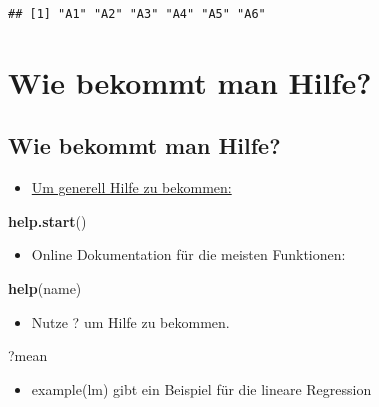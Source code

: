 \documentclass[]{article}
\newenvironment{Shaded}{\begin{snugshade}}{\end{snugshade}}
\newcommand{\KeywordTok}[1]{\textcolor[rgb]{0.13,0.29,0.53}{\textbf{{#1}}}}
\newcommand{\NormalTok}[1]{{#1}}
\providecommand{\tightlist}{%
  \setlength{\itemsep}{0pt}\setlength{\parskip}{0pt}}
\begin{document}
\begin{verbatim}
## [1] "A1" "A2" "A3" "A4" "A5" "A6"
\end{verbatim}

\section{Wie bekommt man Hilfe?}\label{wie-bekommt-man-hilfe}

\subsection{Wie bekommt man Hilfe?}\label{wie-bekommt-man-hilfe-1}

\begin{itemize}
\tightlist
\item
  \href{http://itfeature.com/tag/how-to-get-help-in-r}{Um generell Hilfe
  zu bekommen:}
\end{itemize}

\begin{Shaded}
\begin{Highlighting}[]
\KeywordTok{help.start}\NormalTok{()}
\end{Highlighting}
\end{Shaded}

\begin{itemize}
\tightlist
\item
  Online Dokumentation für die meisten Funktionen:
\end{itemize}

\begin{Shaded}
\begin{Highlighting}[]
\KeywordTok{help}\NormalTok{(name)}
\end{Highlighting}
\end{Shaded}

\begin{itemize}
\tightlist
\item
  Nutze ? um Hilfe zu bekommen.
\end{itemize}

\begin{Shaded}
\begin{Highlighting}[]
\NormalTok{?mean}
\end{Highlighting}
\end{Shaded}

\begin{itemize}
\tightlist
\item
  example(lm) gibt ein Beispiel für die lineare Regression
\end{itemize}
\end{document}
